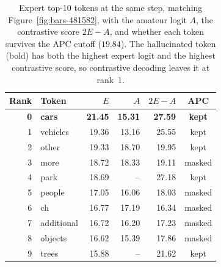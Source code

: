 \begin{table}[htbp]
  \centering
  \begin{tabular}{r l r r r c}
\toprule
Rank & Token & $E$ & $A$ & $2E-A$ & APC \\
\midrule
\textbf{0} & \textbf{cars} & \textbf{21.45} & \textbf{15.31} & \textbf{27.59} & \textbf{kept} \\
1 & vehicles & 19.36 & 13.16 & 25.55 & kept \\
2 & other & 19.33 & 18.70 & 19.95 & kept \\
3 & more & 18.72 & 18.33 & 19.11 & masked \\
4 & park & 18.69 & -- & 27.18 & kept \\
5 & people & 17.05 & 16.06 & 18.03 & masked \\
6 & ch & 16.77 & 17.19 & 16.34 & masked \\
7 & additional & 16.72 & 16.20 & 17.23 & masked \\
8 & objects & 16.62 & 15.39 & 17.86 & masked \\
9 & trees & 15.88 & -- & 21.62 & kept \\
\bottomrule
\end{tabular}
  \caption{Expert top-10 tokens at the same step, matching
  Figure~\ref{fig:bars-481582}, with the amateur logit $A$, the contrastive
  score $2E-A$, and whether each token survives the APC cutoff ($19.84$).
  The hallucinated token (bold) has both the highest expert logit and the highest
  contrastive score, so contrastive decoding leaves it at rank~1.}
  \label{tab:top10-481582}
\end{table}


